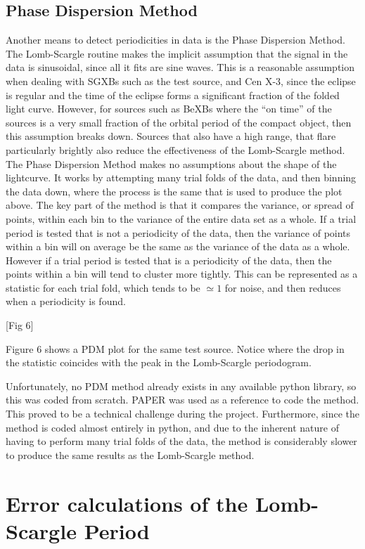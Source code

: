 \subsection{Phase Dispersion Method}
Another means to detect periodicities in data is the Phase Dispersion Method. The Lomb-Scargle routine makes the implicit assumption that the signal in the data is sinusoidal, since all it fits are sine waves. This is a reasonable assumption when dealing with SGXBs such as the test source, and Cen X-3, since the eclipse is regular and the time of the eclipse forms a significant fraction of the folded light curve.  However, for sources such as BeXBs where the \textquotedblleft{}on time\textquotedblright{} of the sources is a very small fraction of the orbital period of the compact object, then this assumption breaks down. Sources that also have a high range, that flare particularly brightly also reduce the effectiveness of the Lomb-Scargle method. 
The Phase Dispersion Method makes no assumptions about the shape of the lightcurve. It works by attempting many trial folds of the data, and then binning the data down, where the process is the same that is used to produce the plot above. The key part of the method is that it compares the variance, or spread of points, within each bin to the variance of the entire data set as a whole. If a trial period is tested that is not a periodicity of the data, then the variance of points within a bin will on average be the same as the variance of the data as a whole. However if a trial period is tested that is a periodicity of the data, then the points within a bin will tend to cluster more tightly. This can be represented as a statistic for each trial fold, which tends to be $\simeq1$ for noise, and then reduces when a periodicity is found.

[Fig 6]

Figure 6 shows a PDM plot for the same test source. Notice where the drop in the statistic coincides with the peak in the Lomb-Scargle periodogram.

Unfortunately, no PDM method already exists in any available python library, so this was coded from scratch. PAPER was used as a reference to code the method. This proved to be a technical challenge during the project. Furthermore, since the method is coded almost entirely in python, and due to the inherent nature of having to perform many trial folds of the data, the method is considerably slower to produce the same results as the Lomb-Scargle method. 

\section{Error calculations of the Lomb-Scargle Period}

